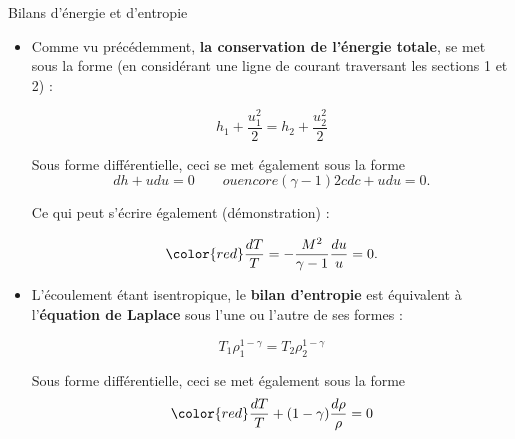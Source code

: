 %
%
%
%
%
%
%

\begin{frame}{Bilans d'énergie et d'entropie }
\small

\begin{itemize}

\item Comme vu précédemment, {\bf la conservation de l'énergie totale}, se met sous la forme 
 (en considérant une ligne de courant traversant les sections 1 et 2) :

$$
h_1  + \frac{u_1^2}{2} = h_2  + \frac{u_2^2}{2}
$$



\pause
\bigskip

Sous forme différentielle, ceci se met également sous la forme 
$$
 dh + u du = 0 \qquad { ou encore } (\gamma -1) 2c dc + u du = 0.
$$  

Ce qui peut s'écrire également (démonstration) :


$$\color{red}\frac{dT}{T}  = - \frac{M^2}{\gamma - 1} \frac{du}{u} = 0.$$


\item 
L'écoulement étant isentropique, le {\bf bilan d'entropie}  est équivalent à l'{\bf équation de Laplace } sous l'une ou l'autre de ses formes :

$$
T_1 \rho_1^{1-\gamma} =   T_2 \rho_2^{1-\gamma}
$$


\pause
\bigskip

Sous forme différentielle, ceci se met également sous la forme 
$$
\color{red} \frac{dT}{T} +  (1- \gamma) \frac{d\rho}{\rho}  = 0
$$  

\end{itemize}

\end{frame}


